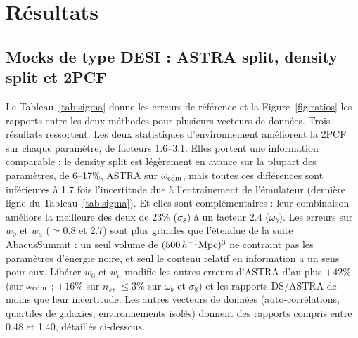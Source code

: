 \section{Résultats}
\label{sec:results}

\subsection{Mocks de type DESI : ASTRA split, density split et 2PCF}

Le Tableau~\ref{tab:sigma} donne les erreurs de référence et la Figure~\ref{fig:ratios} les rapports entre les deux méthodes pour plusieurs vecteurs de données. Trois résultats ressortent. Les deux statistiques d'environnement améliorent la 2PCF sur chaque paramètre, de facteurs 1.6--3.1. Elles portent une information comparable : le density split est légèrement en avance sur la plupart des paramètres, de 6--17\%, ASTRA sur $\omega_{\rm cdm}$, mais toutes ces différences sont inférieures à 1.7 fois l'incertitude due à l'entraînement de l'émulateur (dernière ligne du Tableau~\ref{tab:sigma}). Et elles sont complémentaires : leur combinaison améliore la meilleure des deux de 23\% ($\sigma_8$) à un facteur 2.4 ($\omega_b$). Les erreurs sur $w_0$ et $w_a$ ($\simeq0.8$ et 2.7) sont plus grandes que l'étendue de la suite AbacusSummit : un seul volume de $(500\,h^{-1}\mathrm{Mpc})^3$ ne contraint pas les paramètres d'énergie noire, et seul le contenu relatif en information a un sens pour eux. Libérer $w_0$ et $w_a$ modifie les autres erreurs d'ASTRA d'au plus $+42\%$ (sur $\omega_{\rm cdm}$ ; $+16\%$ sur $n_s$, $\le3\%$ sur $\omega_b$ et $\sigma_8$) et les rapports DS/ASTRA de moins que leur incertitude. Les autres vecteurs de données (auto-corrélations, quartiles de galaxies, environnements isolés) donnent des rapports compris entre 0.48 et 1.40, détaillés ci-dessous.

